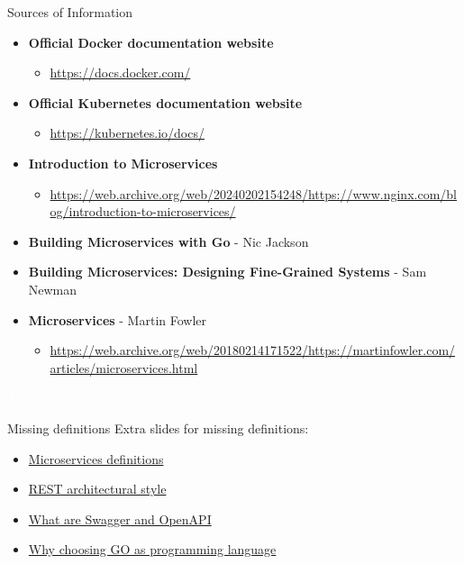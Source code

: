 \documentclass{beamer}
\begin{document}
\begin{frame}{Sources of Information}
	\begin{itemize}
		\item \textbf{Official Docker documentation website}
		\begin{itemize}
			\item \url{https://docs.docker.com/}
		\end{itemize}

		\item \textbf{Official Kubernetes documentation website}
		\begin{itemize}
			\item \url{https://kubernetes.io/docs/}
		\end{itemize}

		\item \textbf{Introduction to Microservices}
		\begin{itemize}
			\item \url{https://web.archive.org/web/20240202154248/https://www.nginx.com/blog/introduction-to-microservices/}
		\end{itemize}

		\item \textbf{Building Microservices with Go} - Nic Jackson

		\item \textbf{Building Microservices: Designing Fine-Grained Systems} - Sam Newman

		\item \textbf{Microservices} - Martin Fowler
		\begin{itemize}
			\item \url{https://web.archive.org/web/20180214171522/https://martinfowler.com/articles/microservices.html}
		\end{itemize}
	\end{itemize}
\end{frame}

\begin{frame}{}
	\begin{center}
		\Huge{\textcolor{white}{Thank you for your attention!}}
	\end{center}
\end{frame}

\begin{frame}{Missing definitions}
	\label{index_1}
	Extra slides for missing definitions:
		\begin{itemize}
			\item \hyperlink{microservices_definitions}{Microservices definitions}
			\item \hyperlink{rest}{REST architectural style}
			\item \hyperlink{swagger_openapi}{What are Swagger and OpenAPI}
			\item \hyperlink{golang}{Why choosing GO as programming language}
		\end{itemize}
\end{frame}
\end{document}
